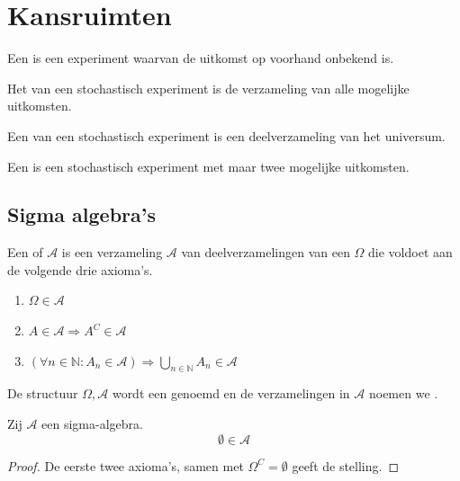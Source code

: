 \documentclass[main.tex]{subfiles}
\begin{document}
\chapter{Kansruimten}
\label{cha:kansruimten}

\begin{de}
  Een  is een experiment waarvan de uitkomst op voorhand onbekend is.
\end{de}

\begin{de}
  Het  van een stochastisch experiment is de verzameling van alle mogelijke uitkomsten.
\end{de}

\begin{de}
  Een  van een stochastisch experiment is een deelverzameling van het universum.
\end{de}

\begin{de}
  Een  is een stochastisch experiment met maar twee mogelijke uitkomsten.
\end{de}

\section{Sigma algebra's}

\begin{de}
  \label{de:sigma-algebra}
  Een  of  $\mathcal{A}$ is een verzameling $\mathcal{A}$ van deelverzamelingen van een  $\Omega$ die voldoet aan de volgende drie axioma's.
  \begin{enumerate}
  \item $\Omega \in \mathcal{A}$
  \item $A\in \mathcal{A} \Rightarrow A^{C} \in \mathcal{A}$
  \item $(\forall n\in \mathbb{N}: A_{n} \in \mathcal{A}) \Rightarrow \bigcup_{n\in \mathbb{N}}A_{n} \in \mathcal{A}$
  \end{enumerate}
  De structuur $\Omega,\mathcal{A}$ wordt een  genoemd en de verzamelingen in $\mathcal{A}$ noemen we .
\end{de}

\begin{st}
  \label{st:lege-verzameling-in-sigma-algebra}
  Zij $\mathcal{A}$ een sigma-algebra.
  \[ \emptyset \in \mathcal{A} \]

  \begin{proof}
    De eerste twee axioma's, samen met $\Omega^{C} = \emptyset$ geeft de stelling. 
  \end{proof}
\end{st}
\end{document}
